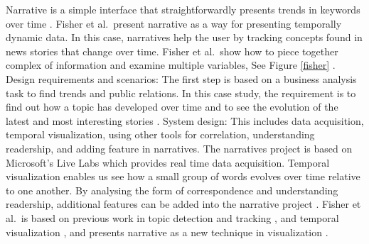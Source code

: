 \documentclass{egpubl}
\begin{document}

Narrative is a simple interface that straightforwardly presents trends in keywords over time \cite{fisher}.
 Fisher et al.\ present narrative as a way for presenting temporally dynamic data. In this case, narratives help the user by tracking concepts found in news stories that change over time. Fisher et al.\ show how to piece together complex of information and examine multiple variables, See Figure \ref{fisher} \cite{fisher}.
Design requirements and scenarios: The first step is based on a business analysis task to find trends and public relations. In this case study, the requirement is to find out how a topic has developed over time and to see the evolution of the latest and most interesting stories \cite{fisher}.
System design: This includes data acquisition, temporal visualization, using other tools for correlation, understanding readership, and adding feature in narratives. The narratives project is based on Microsoft's Live Labs which provides real time data acquisition. Temporal visualization enables us see how a small group of words evolves over time relative to one another. By analysing the form of correspondence and understanding readership, additional features can be added into the narrative project \cite{fisher}.
Fisher et al.\ is based on previous work in topic detection and tracking\cite{dubinko2007} \cite{russell2000}, and temporal visualization \cite{van1999}, and presents narrative as a new technique in visualization \cite{fisher}.
\end{document}
